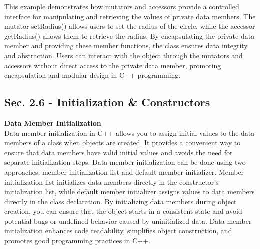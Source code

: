 \begin{solution}
    \noindent This example demonstrates how mutators and accessors provide a controlled interface for manipulating and retrieving the values of private data members. The mutator setRadius() allows users to set the radius 
    of the circle, while the accessor getRadius() allows them to retrieve the radius. By encapsulating the private data member and providing these member functions, the class ensures data integrity and abstraction. Users 
    can interact with the object through the mutators and accessors without direct access to the private data member, promoting encapsulation and modular design in C++ programming. \\
\end{solution}

\subsection*{Sec. 2.6 - Initialization \& Constructors}
\noindent \textbf{Data Member Initialization} \\

Data member initialization in C++ allows you to assign initial values to the data members of a class when objects are created. It provides a convenient way to ensure that data members have valid initial values and avoids 
the need for separate initialization steps. Data member initialization can be done using two approaches: member initialization list and default member initializer. Member initialization list initializes data members directly 
in the constructor's initialization list, while default member initializer assigns values to data members directly in the class declaration. By initializing data members during object creation, you can ensure that the object 
starts in a consistent state and avoid potential bugs or undefined behavior caused by uninitialized data. Data member initialization enhances code readability, simplifies object construction, and promotes good programming 
practices in C++. \\

